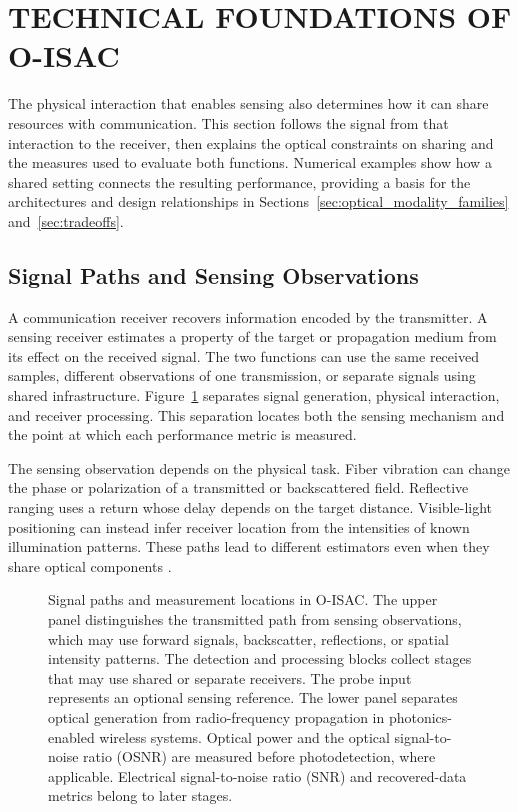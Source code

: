 \section{TECHNICAL FOUNDATIONS OF O-ISAC}
\label{sec:foundations_comparison}

The physical interaction that enables sensing also determines how it can
share resources with communication. This section follows the signal from
that interaction to the receiver, then explains the optical constraints on
sharing and the measures used to evaluate both functions.
Numerical examples show how a shared setting connects the resulting
performance, providing a basis for the architectures and design relationships in
Sections~\ref{sec:optical_modality_families} and~\ref{sec:tradeoffs}.

\subsection{Signal Paths and Sensing Observations}
\label{sec:signal_paths_observations}

A communication receiver recovers information encoded by the transmitter.
A sensing receiver estimates a property of the target or propagation medium
from its effect on the received signal. The two functions can use the same
received samples, different observations of one transmission, or separate
signals using shared infrastructure.
Figure~\ref{fig:joint_evidence_anatomy} separates signal generation,
physical interaction, and receiver processing. This separation locates both
the sensing mechanism and the point at which each performance metric is
measured.

The sensing observation depends on the physical task. Fiber vibration can
change the phase or polarization of a transmitted or backscattered field.
Reflective ranging uses a return whose delay depends on the target distance.
Visible-light positioning can instead infer receiver location from the
intensities of known illumination patterns. These paths lead to different
estimators even when they share optical components
\cite{OISAC_SCR00220,OISAC_SCR00057,OISAC_SCR00912,OISAC_SCR00196}.

\begin{figure}[!t]
\centering

\caption{Signal paths and measurement locations in O-ISAC. The upper panel
distinguishes the transmitted path from sensing observations, which may use
forward signals, backscatter, reflections, or spatial intensity patterns.
The detection and processing blocks collect stages that may use shared or
separate receivers. The probe input represents an optional sensing reference.
The lower panel separates
optical generation from radio-frequency propagation in photonics-enabled
wireless systems. Optical power and the optical signal-to-noise ratio (OSNR)
are measured before photodetection, where applicable. Electrical
signal-to-noise ratio (SNR) and recovered-data metrics belong to later stages.}
\label{fig:joint_evidence_anatomy}
\end{figure}

